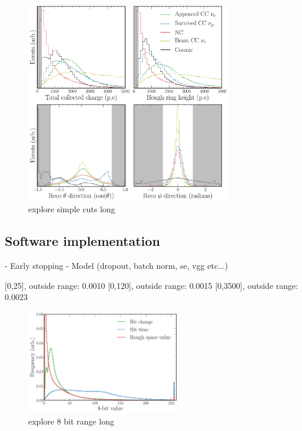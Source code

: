 \begin{figure} %
    \includegraphics[width=0.8\textwidth]{diagrams/6-cvn/chipsnet/explore_simple_cuts.pdf}
    \caption[explore simple cuts short]
    {explore simple cuts long}
    \label{fig:explore_simple_cuts}
\end{figure}

\subsection{Software implementation} %
\label{sec:cvn_baseline_soft} %

- Early stopping
- Model (dropout, batch norm, se, vgg etc...)

[0,25], outside range: 0.0010
    [0,120], outside range: 0.0015
    [0,3500], outside range: 0.0023

\begin{figure} %
    \includegraphics[width=0.6\textwidth]{diagrams/6-cvn/chipsnet/explore_8_bit_range.pdf}
    \caption[explore 8 bit range short]
    {explore 8 bit range long}
    \label{fig:explore_8_bit_range}
\end{figure}


